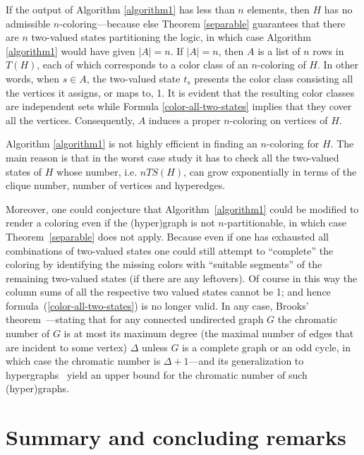 \documentclass[%
12pt,
prereprint,
showpacs,
showkeys,
preprintnumbers,
amsmath,amssymb,
aps,
pra,
longbibliography,
notitlepage
]{revtex4-1}
\theoremstyle{definition}
\begin{document}
        If the output of Algorithm \ref{algorithm1} has less than $n$ elements, then $H$ has no admissible $n$-coloring---because else Theorem \ref{separable} guarantees that there are $n$ two-valued states partitioning the logic, in which case Algorithm \ref{algorithm1} would have given $\vert A \vert = n$. If $\vert A \vert =n$, then $A$ is a list of $n$ rows in $T(H)$, each of which corresponds to a color class of an $n$-coloring of $H$. In other words, when $s\in A$, the two-valued state $t_s$ presents the color class consisting all the vertices it assigns, or maps to, 1. It is evident that the resulting color classes are independent sets while Formula \ref{color-all-two-states} implies that they cover all the vertices. Consequently, $A$ induces a proper $n$-coloring on vertices of $H$.

        Algorithm \ref{algorithm1} is not highly efficient in finding an $n$-coloring for $H$. The main reason is that in the worst case study it has to check all the two-valued states of $H$ whose number, i.e. $nTS(H)$, can grow exponentially in terms of the clique number, number of vertices and hyperedges.

        Moreover, one could conjecture that Algorithm~\ref{algorithm1} could be modified to render a coloring even if the (hyper)graph is not $n$-partitionable, in which case Theorem~\ref{separable} does not apply.
    Because even if one has exhausted all combinations of two-valued states one could still attempt to ``complete'' the coloring by identifying the missing colors with
    ``suitable segments'' of the remaining two-valued states (if there are any leftovers). Of course in this way the column sums of all the respective two valued states cannot be 1; and hence formula~(\ref{color-all-two-states}) is no longer valid.
    In any case, Brooks' theorem~\cite{Brooks1941,Lovasz1975}---stating that for any connected undirected graph $G$ the chromatic number of $G$ is at most its maximum degree (the maximal number of edges that are incident to some vertex) $\Delta$  unless $G$ is a complete graph or an odd cycle, in which case the chromatic number is $\Delta + 1$---and its generalization to hypergraphs~\cite[page 45, Theorem 3.2]{Bretto-MR3077516} yield an upper bound for the chromatic number of such (hyper)graphs.


        \section{Summary and concluding remarks}
\end{document}
